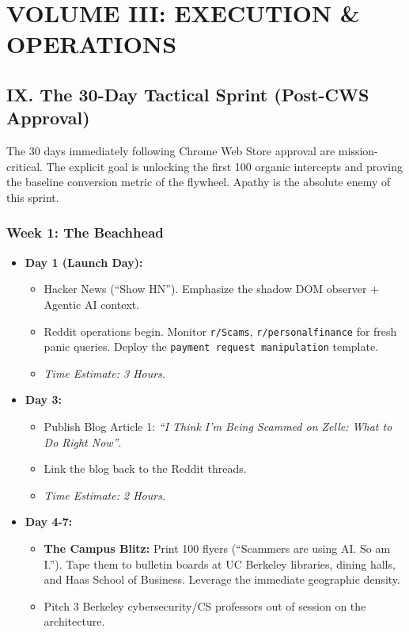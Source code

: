 \documentclass[
]{article}
\providecommand{\tightlist}{%
  \setlength{\itemsep}{0pt}\setlength{\parskip}{0pt}}
\begin{document}
\section{VOLUME III: EXECUTION \&
OPERATIONS}\label{volume-iii-execution-operations}

\subsection{IX. The 30-Day Tactical Sprint (Post-CWS
Approval)}\label{ix.-the-30-day-tactical-sprint-post-cws-approval}

The 30 days immediately following Chrome Web Store approval are
mission-critical. The explicit goal is unlocking the first 100 organic
intercepts and proving the baseline conversion metric of the flywheel.
Apathy is the absolute enemy of this sprint.

\subsubsection{Week 1: The Beachhead}\label{week-1-the-beachhead}

\begin{itemize}
\tightlist
\item
  \textbf{Day 1 (Launch Day):}

  \begin{itemize}
  \tightlist
  \item
    Hacker News (``Show HN''). Emphasize the shadow DOM observer +
    Agentic AI context.
  \item
    Reddit operations begin. Monitor \texttt{r/Scams},
    \texttt{r/personalfinance} for fresh panic queries. Deploy the
    \texttt{payment\ request\ manipulation} template.
  \item
    \emph{Time Estimate: 3 Hours.}
  \end{itemize}
\item
  \textbf{Day 3:}

  \begin{itemize}
  \tightlist
  \item
    Publish Blog Article 1: \emph{``I Think I'm Being Scammed on Zelle:
    What to Do Right Now''}.
  \item
    Link the blog back to the Reddit threads.
  \item
    \emph{Time Estimate: 2 Hours.}
  \end{itemize}
\item
  \textbf{Day 4-7:}

  \begin{itemize}
  \tightlist
  \item
    \textbf{The Campus Blitz:} Print 100 flyers (``Scammers are using
    AI. So am I.''). Tape them to bulletin boards at UC Berkeley
    libraries, dining halls, and Haas School of Business. Leverage the
    immediate geographic density.
  \item
    Pitch 3 Berkeley cybersecurity/CS professors out of session on the
    architecture.
  \end{itemize}
\end{itemize}
\end{document}
